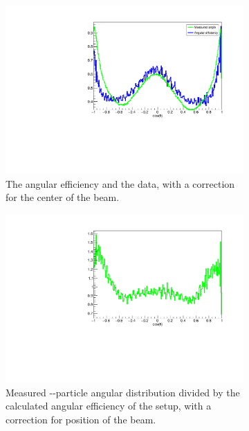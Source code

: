 \begin{figure}[h]
	\begin{subfigure}[t]{.5\linewidth}
		\centering
		\includegraphics[width=\linewidth]{../figures/betaAngles/centerCorrectedAndData.pdf}
		\caption{The angular efficiency and the data, with a correction for the center of the beam. }
		\label{fig:centerCorrection}
	\end{subfigure}
	\begin{subfigure}[t]{.5\linewidth}
		\centering
		\includegraphics[width=\linewidth]{../figures/betaAngles/dataDivEffCenterCorrected.pdf}
		\caption{Measured \be-\al-particle angular distribution divided by the calculated angular efficiency of the setup, with a correction for position of the beam. }
		\label{fig:dataDivEffCenter}
	\end{subfigure}
\caption{}
\end{figure}


